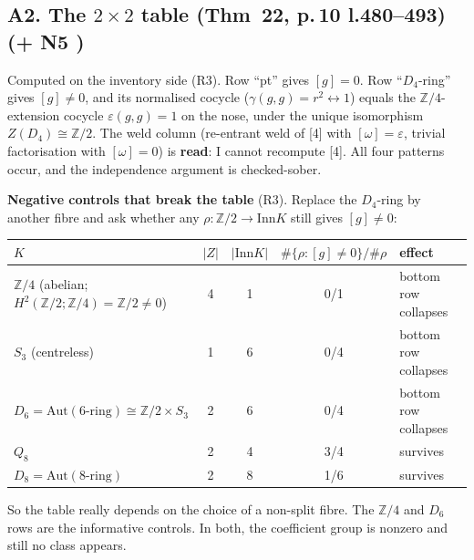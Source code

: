 \documentclass[11pt]{article}
\newcommand{\Z}{\mathbb{Z}}
\newcommand{\Inn}{\mathrm{Inn}}
\newcommand{\Aut}{\mathrm{Aut}}
\newcommand{\vd}[1]{\fbox{\textbf{#1}}}
\begin{document}
\subsection*{A2. The $2\times2$ table (Thm~22, p.\,10 l.480--493) \hfill \vd{OK} (+ N5 \vd{SHOULD})}
Computed on the inventory side (R3). Row ``pt'' gives $[g]=0$. Row ``$D_4$-ring'' gives
$[g]\neq0$, and its normalised cocycle ($\gamma(g,g)=r^2\leftrightarrow1$) equals the $\Z/4$-extension
cocycle $\varepsilon(g,g)=1$ on the nose, under the unique isomorphism $Z(D_4)\cong\Z/2$. The weld
column (re-entrant weld of [4] with $[\omega]=\varepsilon$, trivial factorisation with $[\omega]=0$)
is \textbf{read}: I cannot recompute [4]. All four patterns occur, and the independence argument is
checked-sober.

\textbf{Negative controls that break the table} (R3). Replace the $D_4$-ring by another fibre
and ask whether any $\rho:\Z/2\to\Inn K$ still gives $[g]\ne0$:
\begin{center}\small
\begin{tabular}{lccc l}
\toprule
$K$ & $|Z|$ & $|\Inn K|$ & $\#\{\rho:[g]\ne0\}/\#\rho$ & effect\\
\midrule
$\Z/4$ (abelian; $H^2(\Z/2;\Z/4)=\Z/2\neq0$) & 4 & 1 & 0/1 & bottom row collapses\\
$S_3$ (centreless) & 1 & 6 & 0/4 & bottom row collapses\\
$D_6=\Aut(\text{6-ring})\cong\Z/2\times S_3$ & 2 & 6 & 0/4 & bottom row collapses\\
$Q_8$ & 2 & 4 & 3/4 & survives\\
$D_8=\Aut(\text{8-ring})$ & 2 & 8 & 1/6 & survives\\
\bottomrule
\end{tabular}
\end{center}
So the table really depends on the choice of a non-split fibre. The $\Z/4$ and $D_6$ rows are the
informative controls. In both, the coefficient group is nonzero and still no class appears.
\end{document}
